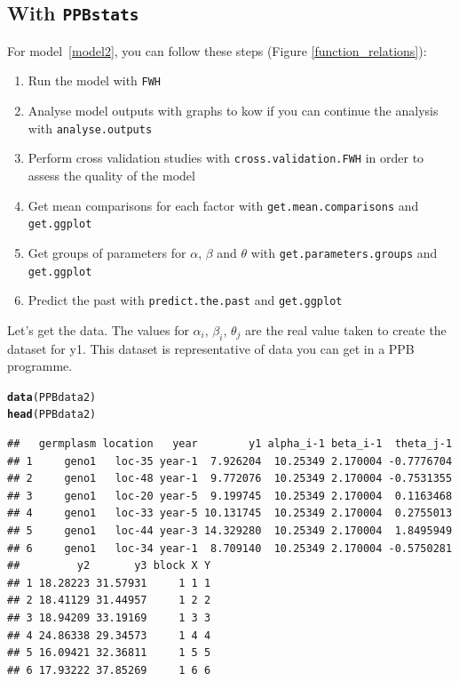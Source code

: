 \documentclass{article}\usepackage[]{graphicx}\usepackage[]{color}
\makeatletter
\newcommand{\hlstd}[1]{\textcolor[rgb]{0.345,0.345,0.345}{#1}}%
\newcommand{\hlkwd}[1]{\textcolor[rgb]{0.737,0.353,0.396}{\textbf{#1}}}%
\newenvironment{kframe}{%
 \def\at@end@of@kframe{}%
 \ifinner\ifhmode%
  \def\at@end@of@kframe{\end{minipage}}%
  \begin{minipage}{\columnwidth}%
 \fi\fi%
 \def\FrameCommand##1{\hskip\@totalleftmargin \hskip-\fboxsep
 \colorbox{shadecolor}{##1}\hskip-\fboxsep
     \hskip-\linewidth \hskip-\@totalleftmargin \hskip\columnwidth}%
 \MakeFramed {\advance\hsize-\width
   \@totalleftmargin\z@ \linewidth\hsize
   \@setminipage}}%
 {\par\unskip\endMakeFramed%
 \at@end@of@kframe}
\newenvironment{knitrout}{}{} %
\newcommand{\pack}{\texttt{PPBstats}}
\makeatother
\begin{document}
\subsection{With \pack}

For model~\ref{model2}, you can follow these steps (Figure \ref{function_relations}):

\begin{enumerate}
\item Run the model with \texttt{FWH}
\item Analyse model outputs with graphs to kow if you can continue the analysis with \texttt{analyse.outputs}
\item Perform cross validation studies with \texttt{cross.validation.FWH} in order to assess the quality of the model
\item Get mean comparisons for each factor with \texttt{get.mean.comparisons} and \texttt{get.ggplot}
\item Get groups of parameters for $\alpha$, $\beta$ and $\theta$ with \texttt{get.parameters.groups} and \texttt{get.ggplot}
\item Predict the past with \texttt{predict.the.past} and \texttt{get.ggplot}
\end{enumerate}

Let's get the data.
The values for $\alpha_i$, $\beta_i$, $\theta_j$ are the real value taken to create the dataset for y1.
This dataset is representative of data you can get in a PPB programme.

\begin{knitrout}
\color{fgcolor}\begin{kframe}
\begin{alltt}
\hlkwd{data}\hlstd{(PPBdata2)}
\hlkwd{head}\hlstd{(PPBdata2)}
\end{alltt}
\begin{verbatim}
##   germplasm location   year        y1 alpha_i-1 beta_i-1  theta_j-1
## 1     geno1   loc-35 year-1  7.926204  10.25349 2.170004 -0.7776704
## 2     geno1   loc-48 year-1  9.772076  10.25349 2.170004 -0.7531355
## 3     geno1   loc-20 year-5  9.199745  10.25349 2.170004  0.1163468
## 4     geno1   loc-33 year-5 10.131745  10.25349 2.170004  0.2755013
## 5     geno1   loc-44 year-3 14.329280  10.25349 2.170004  1.8495949
## 6     geno1   loc-34 year-1  8.709140  10.25349 2.170004 -0.5750281
##         y2       y3 block X Y
## 1 18.28223 31.57931     1 1 1
## 2 18.41129 31.44957     1 2 2
## 3 18.94209 33.19169     1 3 3
## 4 24.86338 29.34573     1 4 4
## 5 16.09421 32.36811     1 5 5
## 6 17.93222 37.85269     1 6 6
\end{verbatim}
\end{kframe}
\end{knitrout}
\end{document}
